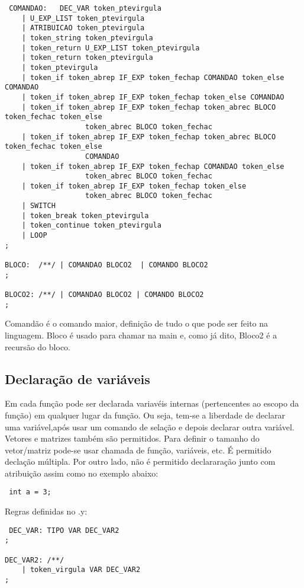 \documentclass[a4paper,10pt]{article}
\begin{document}
\begin{verbatim}
 COMANDAO:   DEC_VAR token_ptevirgula
	| U_EXP_LIST token_ptevirgula
	| ATRIBUICAO token_ptevirgula
	| token_string token_ptevirgula
	| token_return U_EXP_LIST token_ptevirgula
	| token_return token_ptevirgula
	| token_ptevirgula
	| token_if token_abrep IF_EXP token_fechap COMANDAO token_else COMANDAO
	| token_if token_abrep IF_EXP token_fechap token_else COMANDAO
	| token_if token_abrep IF_EXP token_fechap token_abrec BLOCO token_fechac token_else 
                   token_abrec BLOCO token_fechac
	| token_if token_abrep IF_EXP token_fechap token_abrec BLOCO token_fechac token_else
                   COMANDAO
	| token_if token_abrep IF_EXP token_fechap COMANDAO token_else 
                   token_abrec BLOCO token_fechac
	| token_if token_abrep IF_EXP token_fechap token_else 
                   token_abrec BLOCO token_fechac
	| SWITCH
	| token_break token_ptevirgula
	| token_continue token_ptevirgula
	| LOOP	
;

BLOCO:	/**/ | COMANDAO BLOCO2 	| COMANDO BLOCO2
;

BLOCO2: /**/ | COMANDAO BLOCO2 | COMANDO BLOCO2
;
\end{verbatim}

Comandão é o comando maior, definição de tudo o que pode ser feito na linguagem. Bloco é usado para chamar na main e, como já dito, Bloco2 é a recursão do bloco.

\subsection{Declaração de variáveis}

Em cada função pode ser declarada variavéis internas (pertencentes ao escopo da função) em qualquer lugar da função. Ou seja,
tem-se a liberdade de declarar uma variável,após usar um comando de selação e depois declarar outra variável. Vetores e matrizes também são permitidos. 
Para definir o tamanho do vetor/matriz pode-se usar chamada de função, variáveis, etc. É permitido declação múltipla. Por outro lado,
não é permitido declararação junto com atribuição assim como no exemplo abaixo:

\begin{verbatim}
 int a = 3;
\end{verbatim}

Regras definidas no .y:

\begin{verbatim}
 DEC_VAR: TIPO VAR DEC_VAR2
;

DEC_VAR2: /**/ 
	| token_virgula VAR DEC_VAR2
;
\end{verbatim}
\end{document}
